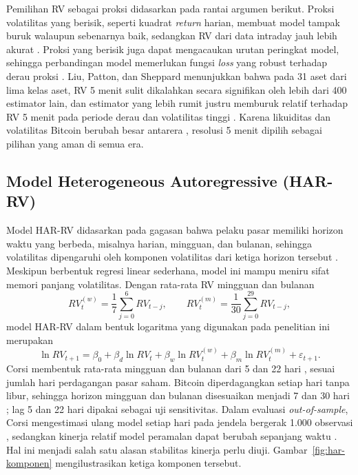 Pemilihan RV sebagai proksi didasarkan pada rantai argumen berikut. Proksi
volatilitas yang berisik, seperti kuadrat \textit{return} harian, membuat model
tampak buruk walaupun sebenarnya baik, sedangkan RV dari data intraday jauh
lebih akurat \cite{andersen1998}. Proksi yang berisik juga dapat mengacaukan
urutan peringkat model, sehingga perbandingan model memerlukan fungsi
\textit{loss} yang robust terhadap derau proksi \cite{patton2011}. Liu, Patton,
dan Sheppard menunjukkan bahwa pada 31 aset dari lima kelas aset, RV 5 menit
sulit dikalahkan secara signifikan oleh lebih dari 400 estimator lain, dan
estimator yang lebih rumit justru memburuk relatif terhadap RV 5 menit pada
periode derau dan volatilitas tinggi \cite{liu2015}. Karena likuiditas dan
volatilitas Bitcoin berubah besar antarera \cite{do2026}, resolusi 5 menit
dipilih sebagai pilihan yang aman di semua era.

\subsection{Model Heterogeneous Autoregressive (HAR-RV)}
Model HAR-RV didasarkan pada gagasan bahwa pelaku pasar memiliki horizon waktu
yang berbeda, misalnya harian, mingguan, dan bulanan, sehingga volatilitas
dipengaruhi oleh komponen volatilitas dari ketiga horizon tersebut
\cite{corsi2009}. Meskipun berbentuk regresi linear sederhana, model ini mampu
meniru sifat memori panjang volatilitas. Dengan rata-rata RV mingguan dan
bulanan
\begin{equation}
  RV_t^{(w)} = \frac{1}{7}\sum_{j=0}^{6} RV_{t-j},
  \qquad
  RV_t^{(m)} = \frac{1}{30}\sum_{j=0}^{29} RV_{t-j},
  \label{eq:rata-rv}
\end{equation}
model HAR-RV dalam bentuk logaritma yang digunakan pada penelitian ini
merupakan
\begin{equation}
  \ln RV_{t+1} = \beta_0 + \beta_d \ln RV_t + \beta_w \ln RV_t^{(w)}
  + \beta_m \ln RV_t^{(m)} + \varepsilon_{t+1}.
  \label{eq:har}
\end{equation}
Corsi membentuk rata-rata mingguan dan bulanan dari 5 dan 22 hari
\cite{corsi2009}, sesuai jumlah hari perdagangan pasar saham. Bitcoin
diperdagangkan setiap hari tanpa libur, sehingga horizon mingguan dan bulanan
disesuaikan menjadi 7 dan 30 hari \cite{qiu2025}; lag 5 dan 22 hari dipakai
sebagai uji sensitivitas. Dalam evaluasi \textit{out-of-sample}, Corsi
mengestimasi ulang model setiap hari pada jendela bergerak 1.000 observasi
\cite{corsi2009}, sedangkan kinerja relatif model peramalan dapat berubah
sepanjang waktu \cite{rossi2013}. Hal ini menjadi salah satu alasan
stabilitas kinerja perlu diuji. Gambar~\ref{fig:har-komponen}
mengilustrasikan ketiga komponen tersebut.

